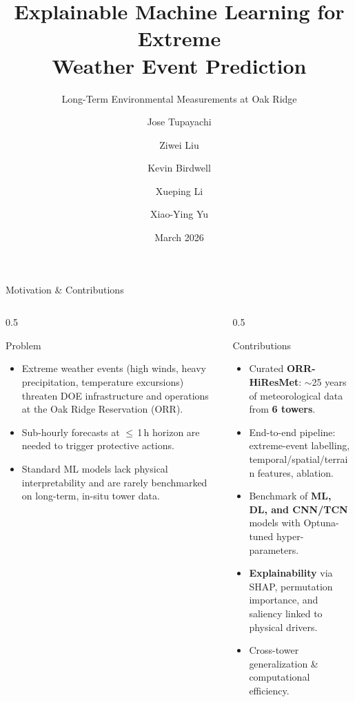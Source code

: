 \documentclass[aspectratio=169,10pt]{beamer}
\title{Explainable Machine Learning for Extreme\\Weather Event Prediction}
\subtitle{Long-Term Environmental Measurements at Oak Ridge}
\author{Jose Tupayachi \and Ziwei Liu \and Kevin Birdwell \and Xueping Li \and Xiao-Ying Yu}
\institute{Oak Ridge National Laboratory \and University of Tennessee, Knoxville}
\date{March 2026}
\begin{document}
\maketitle

\begin{frame}{Motivation \& Contributions}
\begin{columns}[T]
  \begin{column}{0.5\textwidth}
    \begin{block}{Problem}
      \begin{itemize}
        \item Extreme weather events (high winds, heavy precipitation,
              temperature excursions) threaten DOE infrastructure and
              operations at the Oak Ridge Reservation (ORR).
        \item Sub-hourly forecasts at $\le$\,1\,h horizon are needed
              to trigger protective actions.
        \item Standard ML models lack physical interpretability and
              are rarely benchmarked on long-term, in-situ tower data.
      \end{itemize}
    \end{block}
  \end{column}

  \begin{column}{0.5\textwidth}
    \begin{block}{Contributions}
      \begin{itemize}
        \item Curated \textbf{ORR-HiResMet}: $\sim$25 years of
              meteorological data from \textbf{6 towers}.
        \item End-to-end pipeline: extreme-event labelling,
              temporal/spatial/terrain features, ablation.
        \item Benchmark of \textbf{ML, DL, and CNN/TCN} models with
              Optuna-tuned hyper-parameters.
        \item \textbf{Explainability} via SHAP, permutation importance,
              and saliency linked to physical drivers.
        \item Cross-tower generalization \& computational efficiency.
      \end{itemize}
    \end{block}
  \end{column}
\end{columns}
\end{frame}
\end{document}
